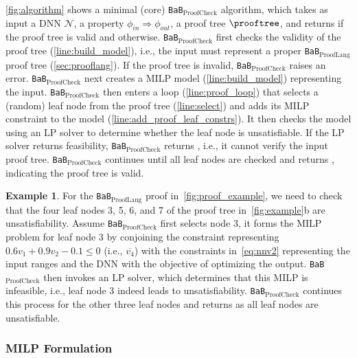 \documentclass[oneside,11pt,dvipsnames]{book}
\numberwithin{equation}{section}
\theoremstyle{definition}
\newtheorem{example}{Example}[section]
\theoremstyle{remark}
\newcommand{\tvn}[1]{\iftoggle{usecomment}{{\color{red}{[TVN]: #1}}}{}}
\newcommand{\hd}[1]{\iftoggle{usecomment}{{\color{blue}{[HD]: #1}}}{}}
\newcommand{\prooflang}{\texttt{BaB$_{\text{ProofLang}}$}}
\newcommand{\proofcheck}{\texttt{BaB$_{\text{ProofCheck}}$}}
\begin{document}
\autoref{fig:algorithm} shows a minimal (core)  \proofcheck{} algorithm, which takes as input a DNN $\mathcal{N}$, a property $\phi_{in} \Rightarrow \phi_{out}$, a proof tree $\prooftree$, and returns \certified if the proof tree is valid and \uncertified otherwise. 
\proofcheck{} first checks the validity of the proof tree (\autoref{line:build_model}), i.e., the input must represent a proper \prooflang{} proof tree (\autoref{sec:prooflang}).  
If the proof tree is invalid, \proofcheck{} raises an error.
\proofcheck{} next creates a MILP model (\autoref{line:build_model}) representing the input. %
\proofcheck{} then enters a loop (\autoref{line:proof_loop}) that selects a (random) leaf node from the proof tree (\autoref{line:select}) and adds its MILP constraint to the model (\autoref{line:add_proof_leaf_constrs}). It then checks the model using an LP solver to determine whether the leaf node is unsatisfiable. If the LP solver returns feasibility, \proofcheck{} returns \uncertified, i.e., it cannot verify the input proof tree. 
\proofcheck{} continues until all leaf nodes are checked and returns \certified, indicating the proof tree is valid.



\begin{example} 
    For the \prooflang{} proof in~\autoref{fig:proof_example}, we need to check that the four leaf nodes 3, 5, 6, and 7 of the proof tree in~\autoref{fig:example}b are unsatisfiability. Assume \proofcheck{} first selects node 3, it forms the MILP problem for leaf node 3 by conjoining the constraint representing $0.6v_1 + 0.9v_2 - 0.1 \le 0$ (i.e., $\overline{v_4}$) %
with the constraints in~\autoref{eq:nnv2} representing the input ranges and the DNN with the objective of optimizing the output. \proofcheck{} then invokes an LP solver, which determines that this MILP is infeasible, i.e., leaf node 3 indeed leads to unsatisfiability. \proofcheck{} continues this process for the other three leaf nodes and returns \certified as all leaf nodes are unsatisfiable.
\end{example}

\subsubsection{MILP Formulation}\label{sec:milp-formulation}
\end{document}
